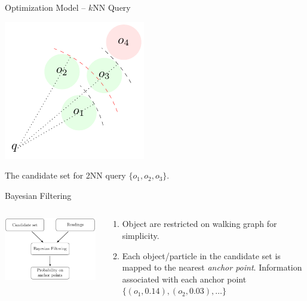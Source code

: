 \documentclass[xcolor={usenames,dvipsnames}]{beamer}
\begin{document}
\begin{frame}[label={sec:org2d6d1c0}]{Optimization Model -- \(k\)NN Query}
\begin{center}
\includegraphics[width=.5\textwidth]{img/knn-filter.pdf}
\end{center}

The candidate set for 2NN query \(\{o_1, o_2, o_3\}\).
\end{frame}

\begin{frame}[label={sec:org4f29f69}]{Bayesian Filtering}
\begin{columns}
\begin{column}{0.5\columnwidth}
\begin{center}
\includegraphics[width=.9\linewidth]{img/bayesian-filter.pdf}
\end{center}
\end{column}

\begin{column}{0.5\columnwidth}
\begin{enumerate}
\item Object are restricted on walking graph for simplicity.
\item Each object/particle in the candidate set is mapped to the
nearest \emph{anchor point}.  Information associated with each
anchor point \(\{(o_1, 0.14), (o_2, 0.03), \dots\}\)
\end{enumerate}
\end{column}
\end{columns}
\end{frame}
\end{document}

